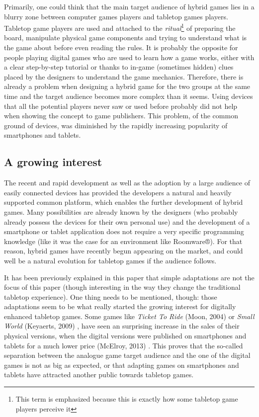 Primarily, one could think that the main target audience of hybrid games lies in a blurry zone between computer games players and tabletop games players. Tabletop game players are used and attached to the \textit{ritual}\footnote{This term is emphasized because this is exactly how some tabletop game players perceive it} of preparing the board, manipulate physical game components and trying to understand what is the game about before even reading the rules.
It is probably the opposite for people playing digital games who are used to learn how a game works, either with a clear step-by-step tutorial or thanks to in-game (sometimes hidden) clues placed by the designers to understand the game mechanics. 
Therefore, there is already a problem when designing a hybrid game for the two groups at the same time and the target audience becomes more complex than it seems. Using devices that all the potential players never saw or used before probably did not help when showing the concept to game publishers. 
This problem, of the common ground of devices, was diminished by the rapidly increasing popularity of smartphones and tablets.

\subsection{A growing interest}
The recent and rapid development as well as the adoption by a large audience of easily connected devices has provided the developers a natural and heavily supported common platform, which enables the further development of hybrid games. Many possibilities are already known by the designers (who probably already possess the devices for their own personal use) and the development of a smartphone or tablet application does not require a very specific programming knowledge (like it was the case for an environment like Roomware®). For that reason, hybrid games have recently begun appearing on the market, and could well be a natural evolution for tabletop games if the audience follows.

It has been previously explained in this paper that simple adaptations are not the focus of this paper (though interesting in the way they change the traditional tabletop experience). 
One thing needs to be mentioned, though: those adaptations seem to be what really started the growing interest for digitally enhanced tabletop games. Some games like \textit{Ticket To Ride} (Moon, 2004) \cite{game:ticket} or \textit{Small World} (Keyaerts, 2009) \cite{game:tw}, have seen an surprising increase in the sales of their physical versions, when the digital versions were published on smartphones and tablets for a much lower price (McElroy, 2013) \cite{web:poly}. This proves that the so-called separation between the analogue game target audience and the one of the digital games is not as big as expected, or that adapting games on smartphones and tablets have attracted another public towards tabletop games.

